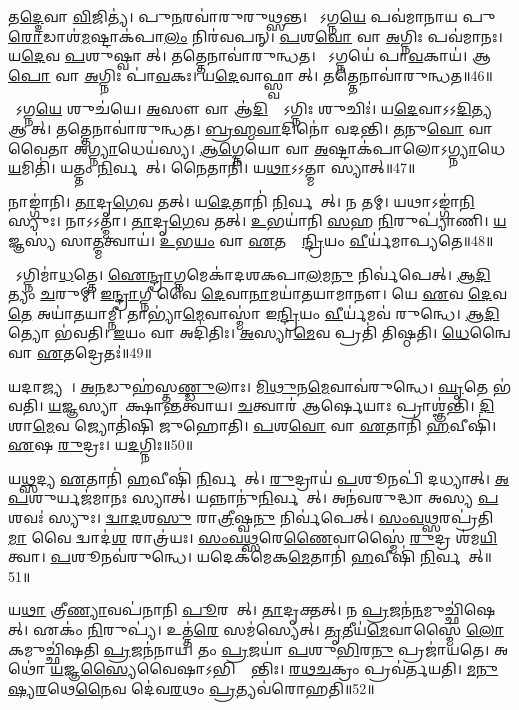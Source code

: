 𑌤\ul{𑌦𑍍𑌦𑍇}𑌵𑌾 \ul{𑌵𑌿}𑌜𑌿𑌤𑍍𑌯॑।
𑌪𑍁\ul{𑌨}𑌰𑌵𑌾॑𑌰𑍁𑌰𑍁𑌥𑍍𑌸𑌨𑍍𑌤।
𑌤𑍇᳚𑌽𑌗𑍍𑌨\ul{𑌯𑍇} 𑌪𑌵॑𑌮𑌾𑌨𑌾𑌯 𑌪𑍁\ul{𑌰𑍋}𑌡𑌾𑌶॑\ul{𑌮}𑌷𑍍𑌟𑌾𑌕॑𑌪𑌾\ul{𑌲𑌂} 𑌨𑌿𑌰॑𑌵𑌪𑌨𑍍।
\ul{𑌪}𑌶\ul{𑌵𑍋} 𑌵𑌾 \ul{𑌅}𑌗𑍍𑌨𑌿𑌃 𑌪𑌵॑𑌮𑌾𑌨𑌃।
𑌯\ul{𑌦𑍇}𑌵 \ul{𑌪}𑌶𑍁𑌷𑍍𑌵𑌾𑌸𑍀᳚𑌤𑍍।
𑌤𑌤𑍍𑌤𑍇𑌨𑌾𑌵𑌾॑𑌰𑍁𑌨𑍍𑌧𑌤।
𑌤𑍇᳚𑌽𑌗𑍍𑌨𑌯𑍇॑ 𑌪𑌾\ul{𑌵}𑌕𑌾𑌯॑।
𑌆\ul{𑌪𑍋} 𑌵𑌾 \ul{𑌅}𑌗𑍍𑌨𑌿𑌃 𑌪𑌾॑\ul{𑌵}𑌕𑌃।
𑌯\ul{𑌦𑍇}𑌵𑌾𑌫𑍍𑌸𑍍𑌵𑌾𑌸𑍀᳚𑌤𑍍।
𑌤𑌤𑍍𑌤𑍇𑌨𑌾𑌵𑌾॑𑌰𑍁𑌨𑍍𑌧𑌤॥46॥

𑌤𑍇᳚𑌽𑌗𑍍𑌨\ul{𑌯𑍇} 𑌶𑍁𑌚॑𑌯𑍇।
\ul{𑌅}𑌸𑍗 𑌵𑌾 𑌆॑\ul{𑌦𑌿}𑌤𑍍𑌯𑍋᳚\-𑌽𑌗𑍍𑌨𑌿𑌃 𑌶𑍁𑌚𑌿𑌃॑।
𑌯\ul{𑌦𑍇}𑌵𑌾𑌽𑌽\ul{𑌦𑌿}𑌤𑍍𑌯 𑌆𑌸𑍀᳚𑌤𑍍।
𑌤𑌤𑍍𑌤𑍇𑌨𑌾𑌵𑌾॑𑌰𑍁𑌨𑍍𑌧𑌤।
\ul{𑌬𑍍𑌰}\ul{𑌹𑍍𑌮}\ul{𑌵𑌾}𑌦𑌿𑌨𑍋॑ 𑌵𑌦𑌨𑍍𑌤𑌿।
\ul{𑌤}𑌨𑍁\ul{𑌵𑍋} 𑌵𑌾𑌵𑍈𑌤𑌾 𑌅॑\ul{𑌗𑍍𑌨𑍍𑌯𑌾}𑌧𑍇𑌯॑𑌸𑍍𑌯।
\ul{𑌆}\ul{𑌗𑍍𑌨𑍇}𑌯𑍋 𑌵𑌾 \ul{𑌅}𑌷𑍍𑌟𑌾𑌕॑𑌪𑌾𑌲𑍋\-𑌽\ul{𑌗𑍍𑌨𑍍𑌯𑌾}𑌧𑍇\ul{𑌯}𑌮𑌿𑌤𑌿॑।
𑌯𑌤𑍍𑌤𑌂 \ul{𑌨𑌿}𑌰𑍍𑌵𑌪𑍇᳚𑌤𑍍।
𑌨𑍈𑌤𑌾𑌨𑌿॑।
𑌯\ul{𑌥𑌾}𑌽𑌽𑌤𑍍𑌮𑌾 𑌸𑍍𑌯𑌾𑌤𑍍॥47॥

𑌨𑌾𑌙𑍍𑌗𑌾॑𑌨𑌿।
\ul{𑌤𑌾}𑌦𑍃\ul{𑌗𑍇}𑌵 𑌤𑌤𑍍।
𑌯\ul{𑌦𑍇}𑌤𑌾𑌨𑌿॑ \ul{𑌨𑌿}𑌰𑍍𑌵𑌪𑍇᳚𑌤𑍍।
𑌨 𑌤𑌮𑍍।
𑌯𑌥𑌾𑌽𑌙𑍍𑌗𑌾॑\ul{𑌨𑌿} 𑌸𑍍𑌯𑍁𑌃।
𑌨𑌾𑌽𑌽𑌤𑍍𑌮𑌾।
\ul{𑌤𑌾}𑌦𑍃\ul{𑌗𑍇}𑌵 𑌤𑌤𑍍।
\ul{𑌉}𑌭𑌯𑌾॑𑌨𑌿 \ul{𑌸}𑌹 \ul{𑌨𑌿}𑌰𑍁𑌪𑍍𑌯𑌾॑𑌣𑌿।
\ul{𑌯}𑌜𑍍𑌞𑌸𑍍𑌯॑ 𑌸𑌾\ul{𑌤𑍍𑌮}𑌤𑍍𑌵𑌾𑌯॑।
\ul{𑌉}𑌭\ul{𑌯𑌂} 𑌵𑌾 \ul{𑌏}𑌤𑌸𑍍𑌯𑍇᳚\ul{𑌨𑍍𑌦𑍍𑌰𑌿}𑌯𑌂 \ul{𑌵𑍀}𑌰𑍍𑌯॑𑌮𑌾𑌪𑍍𑌯𑌤𑍇॥48॥

𑌯𑍋᳚𑌽𑌗𑍍𑌨𑌿𑌮𑌾॑\ul{𑌧}𑌤𑍍𑌤𑍇।
\ul{𑌐}\ul{𑌨𑍍𑌦𑍍𑌰𑌾}𑌗𑍍𑌨𑌮𑍇𑌕𑌾॑𑌦𑌶𑌕𑌪𑌾\ul{𑌲}𑌮\ul{𑌨𑍁} 𑌨𑌿𑌰𑍍𑌵॑𑌪𑍇𑌤𑍍।
\ul{𑌆}\ul{𑌦𑌿}𑌤𑍍𑌯𑌂 \ul{𑌚}𑌰𑍁𑌮𑍍।
\ul{𑌇}\ul{𑌨𑍍𑌦𑍍𑌰𑌾}𑌗𑍍𑌨𑍀 𑌵𑍈 \ul{𑌦𑍇}𑌵𑌾\ul{𑌨𑌾}𑌮𑌯𑌾॑𑌤𑌯𑌾𑌮𑌾𑌨𑍗।
𑌯𑍇 \ul{𑌏}𑌵 \ul{𑌦𑍇}𑌵\ul{𑌤𑍇} 𑌅𑌯𑌾॑𑌤𑌯𑌾𑌮𑍍𑌨𑍀।
𑌤𑌾𑌭𑍍𑌯𑌾॑\ul{𑌮𑍇}𑌵𑌾𑌸𑍍𑌮𑌾॑ 𑌇\ul{𑌨𑍍𑌦𑍍𑌰𑌿}𑌯𑌂 \ul{𑌵𑍀}𑌰𑍍𑌯॑𑌮𑌵॑ 𑌰𑍁𑌨𑍍𑌧𑍇।
\ul{𑌆}\ul{𑌦𑌿}𑌤𑍍𑌯𑍋 𑌭॑𑌵𑌤𑌿।
\ul{𑌇}𑌯𑌂 𑌵𑌾 𑌅𑌦𑌿॑𑌤𑌿𑌃।
\ul{𑌅}𑌸𑍍𑌯𑌾\ul{𑌮𑍇}𑌵 𑌪𑍍𑌰𑌤𑌿॑ 𑌤𑌿𑌷𑍍𑌠𑌤𑌿।
\ul{𑌧𑍇}𑌨𑍍𑌵𑍈 𑌵𑌾 \ul{𑌏}𑌤𑌦𑍍𑌰𑍇𑌤𑌃॑॥49॥

𑌯𑌦𑌾𑌜𑍍𑌯𑌮𑍍᳚।
\ul{𑌅}\ul{𑌨}𑌡𑍁𑌹॑𑌸𑍍𑌤\ul{𑌣𑍍𑌡𑍁}𑌲𑌾𑌃।
\ul{𑌮𑌿}\ul{𑌥𑍁}𑌨\ul{𑌮𑍇}𑌵𑌾𑌵॑𑌰𑍁𑌨𑍍𑌧𑍇।
\ul{𑌘𑍃}𑌤𑍇 𑌭॑𑌵𑌤𑌿।
\ul{𑌯}𑌜𑍍𑌞𑌸𑍍𑌯𑌾𑌲𑍂᳚𑌕𑍍𑌷𑌾𑌨𑍍𑌤𑌤𑍍𑌵𑌾𑌯।
\ul{𑌚}𑌤𑍍𑌵𑌾𑌰॑ 𑌆𑌰𑍍\mbox{}\ul{𑌷𑍇}𑌯𑌾𑌃 𑌪𑍍𑌰𑌾𑌶𑍍𑌞॑𑌨𑍍𑌤𑌿।
\ul{𑌦𑌿}𑌶𑌾\ul{𑌮𑍇}𑌵 𑌜𑍍𑌯𑍋𑌤𑌿॑𑌷𑌿 𑌜𑍁𑌹𑍋𑌤𑌿।
\ul{𑌪}𑌶\ul{𑌵𑍋} 𑌵𑌾 \ul{𑌏}𑌤𑌾𑌨𑌿॑ \ul{𑌹}𑌵𑍀𑌷𑌿॑।
\ul{𑌏}𑌷 \ul{𑌰𑍁}𑌦𑍍𑌰𑌃।
𑌯\ul{𑌦}𑌗𑍍𑌨𑌿𑌃॥50॥

𑌯\ul{𑌥𑍍𑌸}𑌦𑍍𑌯 \ul{𑌏}𑌤𑌾𑌨𑌿॑ \ul{𑌹}𑌵𑍀𑌷𑌿॑ \ul{𑌨𑌿}𑌰𑍍𑌵𑌪𑍇᳚𑌤𑍍।
\ul{𑌰𑍁}𑌦𑍍𑌰𑌾𑌯॑ \ul{𑌪}𑌶𑍂𑌨𑌪𑌿॑ 𑌦𑌧𑍍𑌯𑌾𑌤𑍍।
\ul{𑌅}\ul{𑌪}𑌶𑍁𑌰𑍍𑌯𑌜॑𑌮𑌾𑌨𑌃 𑌸𑍍𑌯𑌾𑌤𑍍।
𑌯𑌨𑍍𑌨𑌾𑌨𑍁॑\ul{𑌨𑌿}𑌰𑍍𑌵𑌪𑍇᳚𑌤𑍍।
𑌅𑌨॑𑌵𑌰𑍁𑌦𑍍𑌧𑌾 𑌅𑌸𑍍𑌯 \ul{𑌪}𑌶𑌵𑌃॑ 𑌸𑍍𑌯𑍁𑌃।
\ul{𑌦𑍍𑌵𑌾}\ul{𑌦}𑌶\ul{𑌸𑍁} 𑌰𑌾\ul{𑌤𑍍𑌰𑍀}𑌷𑍍𑌵\ul{𑌨𑍁} 𑌨𑌿𑌰𑍍𑌵॑𑌪𑍇𑌤𑍍।
\ul{𑌸𑌂}\ul{𑌵}\ul{𑌥𑍍𑌸}𑌰𑌪𑍍𑌰॑𑌤𑌿\ul{𑌮𑌾} 𑌵𑍈 𑌦𑍍𑌵𑌾𑌦॑\ul{𑌶} 𑌰𑌾𑌤𑍍𑌰॑𑌯𑌃।
\ul{𑌸𑌂}\ul{𑌵}\ul{𑌥𑍍𑌸}𑌰𑍇\ul{𑌣𑍈}𑌵𑌾𑌸𑍍𑌮𑍈॑ \ul{𑌰𑍁}𑌦𑍍𑌰 𑌶॑𑌮\ul{𑌯𑌿}𑌤𑍍𑌵𑌾।
\ul{𑌪}𑌶𑍂𑌨𑌵॑𑌰𑍁𑌨𑍍𑌧𑍇।
𑌯𑌦𑍇𑌕॑𑌮𑍇𑌕\ul{𑌮𑍇}𑌤𑌾𑌨𑌿॑ \ul{𑌹}𑌵𑍀𑌷𑌿॑ \ul{𑌨𑌿}𑌰𑍍𑌵𑌪𑍇᳚𑌤𑍍॥51॥

𑌯\ul{𑌥𑌾} 𑌤𑍍𑌰𑍀\ul{𑌣𑍍𑌯𑌾}𑌵𑌪॑𑌨𑌾𑌨𑌿 \ul{𑌪𑍂}𑌰𑌯𑍇᳚𑌤𑍍।
\ul{𑌤𑌾}𑌦𑍃𑌕𑍍𑌤𑌤𑍍।
𑌨 \ul{𑌪𑍍𑌰}𑌜𑌨॑\ul{𑌨}\-𑌮𑍁𑌚𑍍𑌛𑌿॑𑌷𑍇𑌤𑍍।
𑌏𑌕𑌂॑ \ul{𑌨𑌿}𑌰𑍁𑌪𑍍𑌯॑।
𑌉𑌤𑍍𑌤॑\ul{𑌰𑍇} 𑌸𑌮॑𑌸𑍍𑌯𑍇𑌤𑍍।
\ul{𑌤𑍃}𑌤𑍀𑌯॑\ul{𑌮𑍇}𑌵𑌾𑌸𑍍𑌮𑍈॑ \ul{𑌲𑍋}𑌕𑌮𑍁𑌚𑍍𑌛𑌿॑𑌷𑌤𑌿 \ul{𑌪𑍍𑌰}𑌜𑌨॑𑌨𑌾𑌯।
𑌤𑌂 \ul{𑌪𑍍𑌰}𑌜𑌯𑌾॑ \ul{𑌪}𑌶𑍁\ul{𑌭𑌿}𑌰\ul{𑌨𑍁} 𑌪𑍍𑌰𑌜𑌾॑𑌯𑌤𑍇।
𑌅𑌥𑍋॑ \ul{𑌯}𑌜𑍍𑌞\ul{𑌸𑍍𑌯𑍈}𑌵𑍈𑌷𑌾\-𑌽𑌭𑌿𑌕𑍍𑌰𑌾᳚𑌨𑍍𑌤𑌿𑌃।
\ul{𑌰}\ul{𑌥}\ul{𑌚}𑌕𑍍𑌰𑌂 𑌪𑍍𑌰𑌵॑𑌰𑍍𑌤𑌯𑌤𑌿।
\ul{𑌮}\ul{𑌨𑍁}\ul{𑌷𑍍𑌯}\ul{𑌰}𑌥𑍇\ul{𑌨𑍈}𑌵 𑌦𑍇॑𑌵\ul{𑌰}𑌥𑌂 \ul{𑌪𑍍𑌰}𑌤𑍍𑌯𑌵॑𑌰𑍋𑌹𑌤𑌿॥52॥

